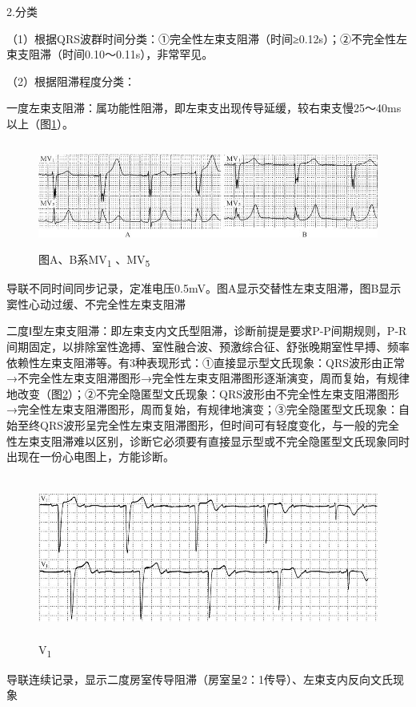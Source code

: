 2.分类

（1）根据QRS波群时间分类：①完全性左束支阻滞（时间≥0.12s）；②不完全性左束支阻滞（时间0.10～0.11s），非常罕见。

（2）根据阻滞程度分类：

一度左束支阻滞：属功能性阻滞，即左束支出现传导延缓，较右束支慢25～40ms以上（图\ref{fig21-2}）。

\begin{figure}[!htbp]
 \centering
 \includegraphics[width=5.55208in,height=1.36458in]{./images/Image00350.jpg}
 \captionsetup{justification=centering}
 \caption{图A、B系MV\textsubscript{1} 、MV\textsubscript{5}}
 \label{fig21-2}
  \end{figure} 
导联不同时间同步记录，定准电压0.5mV。图A显示交替性左束支阻滞，图B显示窦性心动过缓、不完全性左束支阻滞

二度Ⅰ型左束支阻滞：即左束支内文氏型阻滞，诊断前提是要求P-P间期规则，P-R间期固定，以排除室性逸搏、室性融合波、预激综合征、舒张晚期室性早搏、频率依赖性左束支阻滞等。有3种表现形式：①直接显示型文氏现象：QRS波形由正常→不完全性左束支阻滞图形→完全性左束支阻滞图形逐渐演变，周而复始，有规律地改变（图\ref{fig21-3}）；②不完全隐匿型文氏现象：QRS波形由不完全性左束支阻滞图形→完全性左束支阻滞图形，周而复始，有规律地演变；③完全隐匿型文氏现象：自始至终QRS波形呈完全性左束支阻滞图形，但时间可有轻度变化，与一般的完全性左束支阻滞难以区别，诊断它必须要有直接显示型或不完全隐匿型文氏现象同时出现在一份心电图上，方能诊断。

\begin{figure}[!htbp]
 \centering
 \includegraphics[width=5.61458in,height=2.11458in]{./images/Image00351.jpg}
 \captionsetup{justification=centering}
 \caption{V\textsubscript{1}}
 \label{fig21-3}
  \end{figure} 
导联连续记录，显示二度房室传导阻滞（房室呈2：1传导）、左束支内反向文氏现象

